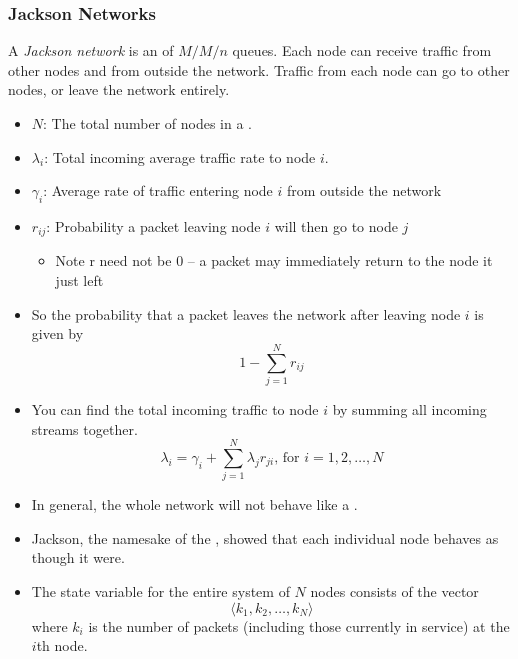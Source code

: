 \subsubsection{Jackson Networks}\label{subsubsec:Jackson_Networks}
\begin{definition}\label{def:Jackson_Network}
  A \emph{Jackson network} is an  of $M/M/n$ queues.
  Each node can receive traffic from other nodes and from outside the network.
  Traffic from each node can go to other nodes, or leave the network entirely.
\end{definition}

\begin{itemize}[noitemsep]
\item $N$: The total number of nodes in a .
\item $\lambda_{i}$: Total incoming average traffic rate to node $i$.
\item $\gamma_{i}$: Average rate of traffic entering node $i$ from outside the network
\item $r_{ij}$: Probability a packet leaving node $i$ will then go to node $j$
  \begin{itemize}[noitemsep]
  \item Note r need not be 0 – a packet may immediately return to the node it just left
  \end{itemize}
\item So the probability that a packet leaves the network after leaving node $i$ is given by
  \begin{equation}\label{eq:Prob_Packet_LEaves_Network}
    1 - \sum\limits_{j=1}^{N} r_{ij}
  \end{equation}

\item You can find the total incoming traffic to node $i$ by summing all incoming streams together.
  \begin{equation}\label{eq:Total_Incoming-Traffic}
    \lambda_{i} = \gamma_{i} + \sum\limits_{j=1}^{N} \lambda_{j} r_{ji} \text{, for } i = 1, 2, \ldots, N
  \end{equation}

\item In general, the whole network will not behave like a .
\item Jackson, the namesake of the , showed that each individual node behaves as though it were.
\item The state variable for the entire system of $N$ nodes consists of the vector
  \begin{equation}\label{eq:Queuing_Network_State_Vector}
    \langle k_{1}, k_{2}, \ldots, k_{N} \rangle
  \end{equation}
  where $k_{i}$ is the number of packets (including those currently in service) at the $i$th node.


\end{itemize}
